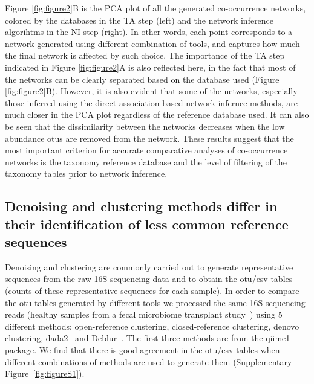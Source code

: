   Figure \ref{fig:figure2}B is the PCA plot of all the generated co-occurrence networks, colored by the databases in the TA step (left) and the network inference algorihtms in the NI step (right).
  In other words, each point corresponds to a network generated using different combination of tools, and captures how much the final network is affected by such choice.
  The importance of the TA step indicated in Figure \ref{fig:figure2}A is also reflected here, in the fact that most of the networks can be clearly separated based on the database used (Figure \ref{fig:figure2}B).
  However, it is also evident that some of the networks, especially those inferred using the direct association based network infernce methods, are much closer in the PCA plot regardless of the reference database used.
  It can also be seen that the dissimilarity between the networks decreases when the low abundance \ac{otu}s are removed from the network.
  These results suggest that the most important criterion for accurate comparative analyses of co-occurrence networks is the taxonomy reference database and the level of filtering of the taxonomy tables prior to network inference.

  \FloatBarrier

  \subsection*{Denoising and clustering methods differ in their identification of less common reference sequences}

  Denoising and clustering are commonly carried out to generate representative sequences from the raw 16S sequencing data and to obtain the \ac{otu}/\ac{esv} tables (counts of these representative sequences for each sample).
  In order to compare the \ac{otu} tables generated by different tools we processed the same 16S sequencing reads (healthy samples from a fecal microbiome transplant study~\cite{Kang2017}) using 5 different methods:  open-reference clustering, closed-reference clustering, denovo clustering, \ac{dada2}~\cite{Callahan2016} and Deblur~\cite{Amir2017}.
  The first three methods are from the \ac{qiime1}~\cite{Caporaso2010} package.
  We find that there is good agreement in the \ac{otu}/\ac{esv} tables when different combinations of methods are used to generate them (Supplementary Figure~\ref{fig:figureS1}).

